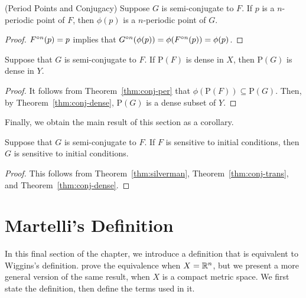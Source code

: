 \documentclass[12pt,draft,twoside]{book}
\begin{document}
  \begin{lemma}
    (Period Points and Conjugacy)
    Suppose $G$ is semi-conjugate to $F$.
    If $p$ is a $n$-periodic point of $F$, then $\phi(p)$ is a $n$-periodic point of $G$.
    \label{thm:conj-per}
    \begin{proof}
      $F^{\circ n}(p) = p$ implies that $G^{\circ n}(\phi(p)) = \phi(F^{\circ n}(p)) = \phi(p)$.
    \end{proof}
  \end{lemma}
\begin{theorem}
    Suppose that $G$ is semi-conjugate to $F$.
    If $\mathrm{P}(F)$ is dense in $X$, then $\mathrm{P}(G)$ is dense in $Y$.
    \label{cor:conj-dense-per}
    \begin{proof}
      It follows from Theorem~\ref{thm:conj-per} that $\phi(\mathrm{P}(F)) \subseteq \mathrm{P}(G)$.
      Then, by Theorem~\ref{thm:conj-dense}, $\mathrm{P}(G)$ is a dense subset of $Y$.
    \end{proof}
\end{theorem}
Finally, we obtain the main result of this section as a corollary.
\begin{corollary}
  Suppose that $G$ is semi-conjugate to $F$.
  If $F$ is sensitive to initial conditions, then $G$ is sensitive to initial conditions.
  \label{cor:conj-sdic}
  \begin{proof}
  This follows from Theorem~\ref{thm:silverman}, Theorem~\ref{thm:conj-trans}, and Theorem~\ref{thm:conj-dense}.
  \end{proof}
\end{corollary}

\section{Martelli's Definition}
In this final section of the chapter, we introduce a definition that is equivalent to Wiggins's definition.
  \citet{martelli} prove the equivalence when $X = \mathbb{R}^n$, but we present a more general version of the same result, when $X$ is a compact metric space.
  We first state the definition, then define the terms used in it.
\end{document}
